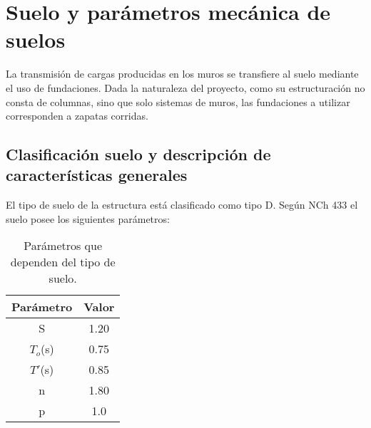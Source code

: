 \newpage
\section{Suelo y parámetros mecánica de suelos}

La transmisión de cargas producidas en los muros se transfiere al suelo mediante el uso de fundaciones. Dada la naturaleza del proyecto, como su estructuración no consta de columnas, sino que solo sistemas de muros, las fundaciones a utilizar corresponden a zapatas corridas.

\subsection{Clasificación suelo y descripción de características generales}

El tipo de suelo de la estructura está clasificado como tipo D. Según NCh 433 el suelo posee los siguientes parámetros:

\begin{table}[H]
  \centering
  \caption{Parámetros que dependen del tipo de suelo.}
    \begin{tabular}{|c|c|}
    \hline
    \textbf{Parámetro} & \textbf{Valor} \bigstrut\\
    \hline
    S     & 1.20 \bigstrut[t]\\
    $T_o$(s) & 0.75 \\
    $T'$(s) & 0.85 \\
    n     & 1.80 \\
    p     & 1.0 \bigstrut[b]\\
    \hline
    \end{tabular}%
\end{table}%